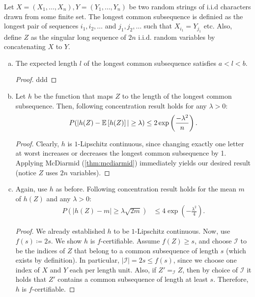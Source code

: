 \begin{aufgabe}
Let $X=(X_1,\dots, X_n), Y=(Y_1,\dots,Y_n)$ be two random strings of i.i.d characters drawn from some finite set.
The longest common subsequence is definied as the longest pair of sequences $i_1,i_2,\dots$ and $j_1,j_2,\dots$ such that $X_{i_1}=Y_{j_1}$ etc.
Also, define $Z$ as the singular long sequence of $2n$ i.i.d. random variables by concatenating $X$ to $Y$.
\begin{enumerate}[(a)]
    \item The expected length $l$ of the longest common subsequence satisfies $a < l < b$.
    \begin{proof}
        ddd
    \end{proof}
    \item  
    Let $h$ be the function that maps $Z$ to the length of the longest common subsequence.
    Then, following concentration result holds for any $\lambda > 0$:
    \begin{align*}
        P(|h(Z) - \mathbb{E}\left[h(Z)\right]| \geq \lambda) \leq 2\exp \left(\frac{-\lambda^2}{n}\right).
    \end{align*}
    \begin{proof}
    Clearly, $h$ is $1$-Lipschitz continuous,
    since changing exactly one letter at worst increases or decreases the longest common subsequence by 1.
    Applying McDiarmid (\autoref{thm:mcdiarmid}) immediately yields our desired result (notice $Z$ uses $2n$ variables).
    \end{proof}
    \item Again, use $h$ as before.
    Following concentration result holds for the mean $m$ of $h(Z)$ and any $\lambda > 0$:
    \begin{align*}
        P(|h(Z) - m | \geq \lambda\sqrt{2m}) &\leq 4\exp\left(-\frac{\lambda^2}{4}\right).
    \end{align*}
    \begin{proof}
        We already established $h$ to be $1$-Lipschitz continuous.
        Now, use $f(s) \coloneqq 2s$. We show $h$ is $f$-certifiable.
        Assume $f(Z) \geq s$, and choose $\mathcal I$ to be the indices of $Z$ that belong to a common subsequence of length $s$ (which exists by definition).
        In particular, $|\mathcal I| = 2s \leq f(s)$, since we choose one index of $X$ and $Y$ each per length unit.
        Also, if $Z' =_{\mathcal I} Z$, then by choice of $\mathcal I$ it holds that $Z'$ contains a common subsequence of length at least $s$. Therefore, $h$ is $f$-certifiable.
    

\end{proof}
\end{enumerate}
\end{aufgabe}
